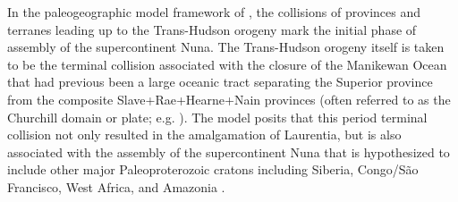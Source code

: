\documentclass[11pt,letterpaper]{article}
\begin{document}
In the paleogeographic model framework of \cite{Pehrsson2015a}, the collisions of provinces and terranes leading up to the Trans-Hudson orogeny mark the initial phase of assembly of the supercontinent Nuna. The Trans-Hudson orogeny itself is taken to be the terminal collision associated with the closure of the Manikewan Ocean that had previous been a large oceanic tract separating the Superior province from the composite Slave+Rae+Hearne+Nain provinces (often referred to as the Churchill domain or plate; e.g. \citealp{Skipton2016a, Weller2017a}). The \cite{Pehrsson2015a} model posits that this period terminal collision not only resulted in the amalgamation of Laurentia, but is also associated with the assembly of the supercontinent Nuna that is hypothesized to include other major Paleoproterozoic cratons including Siberia, Congo/S\~ao Francisco, West Africa, and Amazonia \citep{Whitmeyer2007a, Pehrsson2015a}. 
\end{document}
